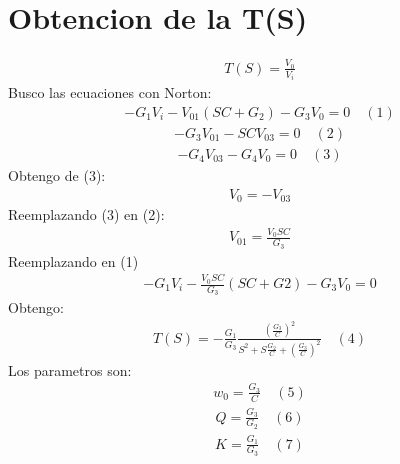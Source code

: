 \documentclass[letterpaper,10pt,english]{sphinxmanual}
\begin{document}
\section{Obtencion de la T(S)}
\label{\detokenize{tp-semanal-2:Obtencion-de-la-T(S)}}\begin{equation*}
\begin{split}T(S) = \frac {V_0} {V_i}\end{split}
\end{equation*}
\sphinxAtStartPar
Busco las ecuaciones con Norton:
\begin{equation*}
\begin{split}- G_1 V_i - V_{01} (SC+G_2) - G_3 V_0 = 0 \quad(1)\end{split}
\end{equation*}\begin{equation*}
\begin{split}- G_3 V_{01} - SC V_{03} = 0 \quad(2)\end{split}
\end{equation*}\begin{equation*}
\begin{split}- G_4 V_{03} -G_4 V_0 = 0 \quad(3)\end{split}
\end{equation*}
\sphinxAtStartPar
Obtengo de (3):
\begin{equation*}
\begin{split}V_0 = - V_{03}\end{split}
\end{equation*}
\sphinxAtStartPar
Reemplazando (3) en (2):
\begin{equation*}
\begin{split}V_{01} = \frac {V_0 SC} {G_3}\end{split}
\end{equation*}
\sphinxAtStartPar
Reemplazando en (1)
\begin{equation*}
\begin{split}-G_1V_i-\frac{V_0 SC}{G_3}\left(SC+G2\right)-G_3V_0=0\end{split}
\end{equation*}
\sphinxAtStartPar
Obtengo:
\begin{equation*}
\begin{split}T(S) = -\frac{G_1}{G_3} \frac{\left(\frac{G_3}{C}\right)^2}{S^2 + S \frac{G_2}{C} + \left(\frac{G_3}{C}\right)^2}\quad(4)\end{split}
\end{equation*}
\sphinxAtStartPar
Los parametros son:
\begin{equation*}
\begin{split}w_0 = \frac{G_3}{C}\quad(5)\end{split}
\end{equation*}\begin{equation*}
\begin{split}Q = \frac {G_3} {G_2}\quad(6)\end{split}
\end{equation*}\begin{equation*}
\begin{split}K = \frac {G_1}{G_3}\quad(7)\end{split}
\end{equation*}
\end{document}
